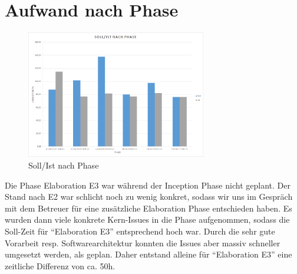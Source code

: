 	\section{Aufwand nach Phase}
        \begin{figure}
            \vspace{-25pt}
            \begin{center}
                \includegraphics[width=0.7\textwidth]{content/schlussbericht/images/zeit_nach_phase.png}
            \end{center}
            \vspace{-20pt}
            \caption{Soll/Ist nach Phase}
        \end{figure}
        Die Phase Elaboration E3 war während der Inception Phase nicht geplant. Der Stand nach E2 war schlicht noch zu wenig konkret, sodass wir uns im Gespräch mit dem Betreuer für eine zusätzliche Elaboration Phase entschieden haben. Es wurden dann viele konkrete Kern-Issues in die Phase aufgenommen, sodass die Soll-Zeit für \enquote{Elaboration E3} entsprechend hoch war. Durch die sehr gute Vorarbeit resp. Softwarearchitektur konnten die Issues aber massiv schneller umgesetzt werden, als geplan. Daher entstand alleine für \enquote{Elaboration E3} eine zeitliche Differenz von ca. 50h.
	
    \newpage
